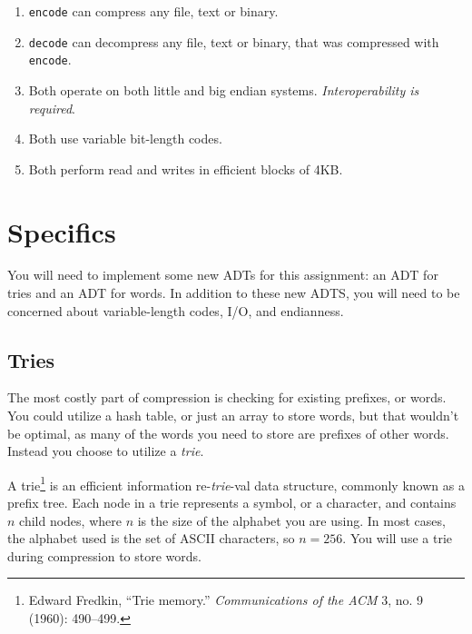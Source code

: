 \documentclass{article}
\begin{document}
\begin{enumerate}
    \item \texttt{encode} can compress any file, text or binary.

    \item \texttt{decode} can decompress any file, text or binary, that was
        compressed with \texttt{encode}.

    \item Both operate on both little and big endian systems.
        \emph{Interoperability is required}.

    \item Both use variable bit-length codes.

    \item Both perform read and writes in efficient blocks of 4KB.
\end{enumerate}

\section{Specifics}

You will need to implement some new ADTs for this assignment: an ADT for tries
and an ADT for words. In addition to these new ADTS, you will need to
be concerned about variable-length codes, I/O, and endianness.

\subsection{Tries}
The most costly part of compression is checking for existing prefixes, or words.
You could utilize a hash table, or just an array to store words, but that
wouldn't be optimal, as many of the words you need to store are prefixes of
other words. Instead you choose to utilize a \emph{trie}.

A trie\footnote{Edward Fredkin, ``{T}rie memory.'' \emph{Communications of the
ACM} 3, no. 9 (1960): 490--499.} is an efficient information re-\emph{trie}-val
data structure, commonly known as a prefix tree. Each node in a trie represents
a symbol, or a character, and contains $n$ child nodes, where $n$ is the size of
the alphabet you are using. In most cases, the alphabet used is the set of ASCII
characters, so $n = 256$. You will use a trie during compression to store words.
\end{document}
